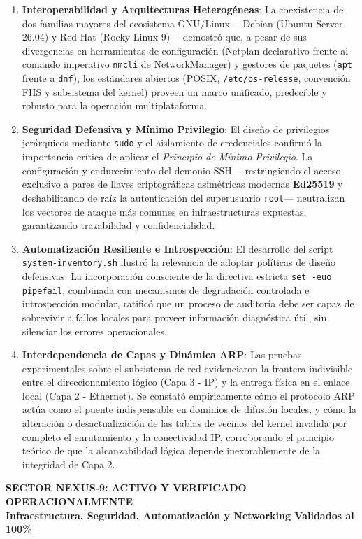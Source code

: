 \documentclass[11pt,a4paper]{article}
\begin{document}
\begin{enumerate}[leftmargin=*, itemsep=1.2pt, topsep=1.5pt]
    \item \textbf{Interoperabilidad y Arquitecturas Heterogéneas}: La coexistencia de dos familias mayores del ecosistema GNU/Linux —Debian (Ubuntu Server 26.04) y Red Hat (Rocky Linux 9)— demostró que, a pesar de sus divergencias en herramientas de configuración (Netplan declarativo frente al comando imperativo \texttt{nmcli} de NetworkManager) y gestores de paquetes (\texttt{apt} frente a \texttt{dnf}), los estándares abiertos (POSIX, \texttt{/etc/os-release}, convención FHS y subsistema del kernel) proveen un marco unificado, predecible y robusto para la operación multiplataforma.
    
    \item \textbf{Seguridad Defensiva y Mínimo Privilegio}: El diseño de privilegios jerárquicos mediante \texttt{sudo} y el aislamiento de credenciales confirmó la importancia crítica de aplicar el \textit{Principio de Mínimo Privilegio}. La configuración y endurecimiento del demonio SSH —restringiendo el acceso exclusivo a pares de llaves criptográficas asimétricas modernas \textbf{Ed25519} y deshabilitando de raíz la autenticación del superusuario \texttt{root}— neutralizan los vectores de ataque más comunes en infraestructuras expuestas, garantizando trazabilidad y confidencialidad.

    \item \textbf{Automatización Resiliente e Introspección}: El desarrollo del script \texttt{system-inventory.sh} ilustró la relevancia de adoptar políticas de diseño defensivas. La incorporación consciente de la directiva estricta \texttt{set -euo pipefail}, combinada con mecanismos de degradación controlada e introspección modular, ratificó que un proceso de auditoría debe ser capaz de sobrevivir a fallos locales para proveer información diagnóstica útil, sin silenciar los errores operacionales.

    \item \textbf{Interdependencia de Capas y Dinámica ARP}: Las pruebas experimentales sobre el subsistema de red evidenciaron la frontera indivisible entre el direccionamiento lógico (Capa 3 - IP) y la entrega física en el enlace local (Capa 2 - Ethernet). Se constató empíricamente cómo el protocolo ARP actúa como el puente indispensable en dominios de difusión locales; y cómo la alteración o desactualización de las tablas de vecinos del kernel invalida por completo el enrutamiento y la conectividad IP, corroborando el principio teórico de que la alcanzabilidad lógica depende inexorablemente de la integridad de Capa 2.
\end{enumerate}

\vspace{0.15cm}
\begin{center}
\begin{tcolorbox}[colback=uncblue!10,colframe=uncblue,width=0.88\textwidth,arc=2.5mm,center]
    \centering\bfseries\small\color{uncblue}
    SECTOR NEXUS-9: ACTIVO Y VERIFICADO OPERACIONALMENTE\\
    \footnotesize Infraestructura, Seguridad, Automatización y Networking Validados al 100\%
\end{tcolorbox}
\end{center}
\end{document}
